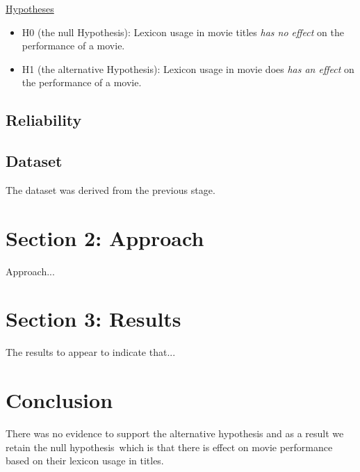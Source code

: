 \documentclass[font=10pt]{article}
\begin{document}
      \underline{Hypotheses}
      \begin{itemize}
        \item H0 (the null Hypothesis): Lexicon usage in movie titles \textit{has no effect} on the performance of a movie.
        \item H1 (the alternative Hypothesis): Lexicon usage in movie does \textit{has an effect} on the performance of a movie.
      \end{itemize}

    \subsection{Reliability}

    \subsection{Dataset}
    The dataset was derived from the previous stage.

  \section{Section 2: Approach}
  Approach...
  \section{Section 3: Results}
  The results to appear to indicate that...
  \section{Conclusion}
  There was no evidence to support the alternative hypothesis and as a result we retain the null hypothesis\
  which is that there is effect on movie performance based on their lexicon usage in titles.

  \appendix
\end{document}
